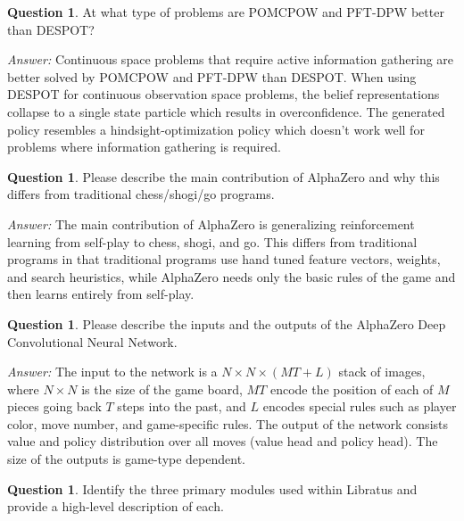 \documentclass{article}
\theoremstyle{definition}
\newtheorem{question}[thm]{Question}
\newenvironment{answer}{\noindent\textit{Answer:}}{}
\begin{document}
\begin{question}
At what type of problems are POMCPOW and PFT-DPW better than DESPOT?  
\end{question}

\begin{answer}
Continuous space problems that require active information gathering are better solved by POMCPOW and PFT-DPW than DESPOT. When using DESPOT for continuous observation space problems, the belief representations collapse to a single state particle which results in overconfidence. The generated policy resembles a hindsight-optimization policy which doesn't work well for problems where information gathering is required.
\end{answer}

\begin{question}
Please describe the main contribution of AlphaZero and why this differs from traditional chess/shogi/go programs.
\end{question}

\begin{answer}
The main contribution of AlphaZero is generalizing reinforcement learning from self-play to chess, shogi, and go. This differs from traditional programs in that traditional programs use hand tuned feature vectors, weights, and search heuristics, while AlphaZero needs only the basic rules of the game and then learns entirely from self-play.
\end{answer}

\begin{question}
Please describe the inputs and the outputs of the AlphaZero Deep Convolutional Neural Network.
\end{question}

\begin{answer}
The input to the network is a $N \times N \times (MT + L)$ stack of images, where $N \times N$ is the size of the game board, $MT$ encode the position of each of $M$ pieces going back $T$ steps into the past, and $L$ encodes special rules such as player color, move number, and game-specific rules. The output of the network consists value and policy distribution over all moves (value head and policy head). The size of the outputs is game-type dependent.
\end{answer}

\begin{question}
Identify the three primary modules used within Libratus and provide a high-level description of each.
\end{question}
\end{document}
